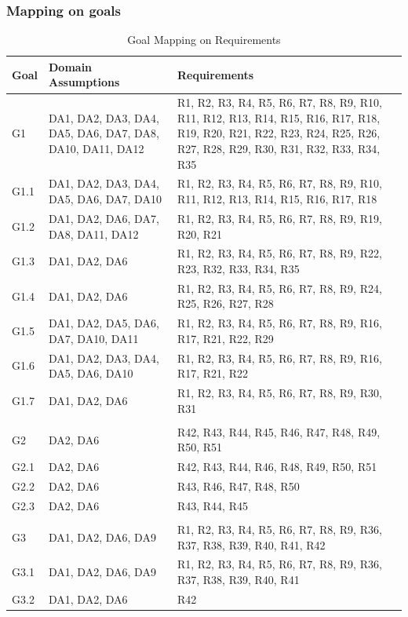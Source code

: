 \subsubsection{Mapping on goals}
\begin{longtable}{|p{2cm}|p{5cm}|p{8cm}|}
   \caption[]{Goal Mapping on Requirements} \\
   \hline
   \textbf{Goal} & \textbf{Domain Assumptions} & \textbf{Requirements} \\ \hline
   \endhead
   G1 & DA1, DA2, DA3, DA4, DA5, DA6, DA7, DA8, DA10, DA11, DA12 & R1, R2, R3, R4, R5, R6, R7, R8, R9, R10, R11, R12, R13, R14, R15, R16, R17, R18, R19, R20, R21, R22, R23, R24, R25, R26, R27, R28, R29, R30, R31, R32, R33, R34, R35 \\ 
   \hline
   G1.1 & DA1, DA2, DA3, DA4, DA5, DA6, DA7, DA10 & R1, R2, R3, R4, R5, R6, R7, R8, R9, R10, R11, R12, R13, R14, R15, R16, R17, R18 \\
   \hline
   G1.2 & DA1, DA2, DA6, DA7, DA8, DA11, DA12 & R1, R2, R3, R4, R5, R6, R7, R8, R9, R19, R20, R21 \\
   \hline
   G1.3 & DA1, DA2, DA6 & R1, R2, R3, R4, R5, R6, R7, R8, R9, R22, R23, R32, R33, R34, R35 \\
   \hline
   G1.4 & DA1, DA2, DA6 & R1, R2, R3, R4, R5, R6, R7, R8, R9, R24, R25, R26, R27, R28 \\
   \hline
   G1.5 & DA1, DA2, DA5, DA6, DA7, DA10, DA11 & R1, R2, R3, R4, R5, R6, R7, R8, R9, R16, R17, R21, R22, R29 \\
   \hline
   G1.6 & DA1, DA2, DA3, DA4, DA5, DA6, DA10 & R1, R2, R3, R4, R5, R6, R7, R8, R9, R16, R17, R21, R22 \\
   \hline
   G1.7 & DA1, DA2, DA6 & R1, R2, R3, R4, R5, R6, R7, R8, R9, R30, R31 \\
   \hline 
    &  &  \\[-1.5ex]
   \hline
   G2 & DA2, DA6 & R42, R43, R44, R45, R46, R47, R48, R49, R50, R51 \\
   \hline
   G2.1 & DA2, DA6 & R42, R43, R44, R46, R48, R49, R50, R51 \\
   \hline
   G2.2 & DA2, DA6 & R43, R46, R47, R48, R50 \\
   \hline
   G2.3 & DA2, DA6 & R43, R44, R45 \\
   \hline
    &  &  \\[-1.5ex]
   \hline
   G3 & DA1, DA2, DA6, DA9 & R1, R2, R3, R4, R5, R6, R7, R8, R9, R36, R37, R38, R39, R40, R41, R42 \\
   \hline
   G3.1 & DA1, DA2, DA6, DA9 & R1, R2, R3, R4, R5, R6, R7, R8, R9, R36, R37, R38, R39, R40, R41 \\
   \hline
   G3.2 & DA1, DA2, DA6 & R42 \\
   \hline
\end{longtable}

